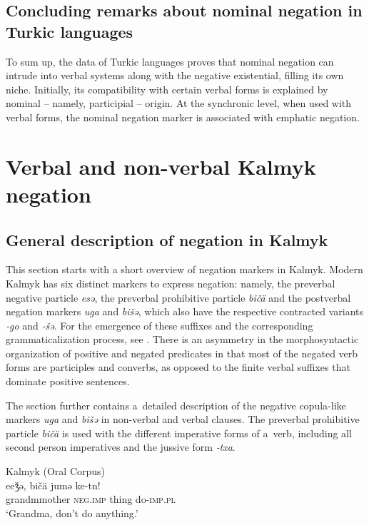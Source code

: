 \documentclass[output=paper,draft,draftmode,colorlinks,citecolor=brown]{langscibook}
\begin{document}
\subsection{Concluding remarks about nominal negation in Turkic languages}\label{sec:BK2.4}

To sum up, the data of Turkic languages proves that nominal negation can intrude into verbal systems along with the negative existential, filling its own niche. Initially, its compatibility with certain verbal forms is explained by nominal – namely, participial – origin. At the synchronic level, when used with verbal forms, the nominal negation marker is associated with emphatic negation.

\section{Verbal and non-verbal Kalmyk negation}\label{sec:BK3}

\subsection{General description of negation in Kalmyk}\label{sec:BK3.1}

This section starts with a short overview of negation markers in Kalmyk. Modern Kalmyk has six distinct markers to express negation: namely, the preverbal negative particle \textit{esǝ}, the preverbal prohibitive particle \textit{bičä} and the postverbal negation markers \textit{uga} and \textit{bišǝ}, which also have the respective contracted variants \textit{‑go} and \textit{‑šǝ}. For the emergence of these suffixes and the corresponding grammaticalization process, see \citet{baranova2018a}. There is an asymmetry in the morphosyntactic organization of positive and negated predicates in that most of the negated verb forms are participles and converbs, as opposed to the finite verbal suffixes that dominate positive sentences. 

The section further contains a detailed description of the negative copula-like markers \textit{uga} and \textit{bišǝ} in non-verbal and verbal clauses. The preverbal prohibitive particle \textit{bičä} is used with the different imperative forms of a verb, including all second person imperatives and the jussive form \textit{‑txa}.

\ea Kalmyk (Oral Corpus) \label{ex:BK32}\\
	\gll eeǯǝ,				bičä		jumǝ	ke-tn!\\
	grandmmother	\textsc{neg.imp}	thing	do-\textsc{imp.pl}\\
	\glt `Grandma, don’t do anything.'
\z
\end{document}
